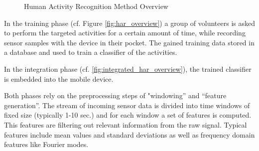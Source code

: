 \begin{figure}[htbp]
\centering
{} \hspace{1cm}
\caption{Human Activity Recognition Method Overview}
\label{fig:HAR_PHASES}
\end{figure}

In the training phase (cf. Figure \ref{fig:har_overview}) a group of
volunteers is asked to perform the targeted activities for a certain
amount of time, while recording sensor samples with the device in
their pocket.  The gained training data stored in a database and used
to train a classifier of the activities.

In the integration phase (cf. \ref{fig:integrated_har_overview}), the
trained classifier is embedded into the mobile device.

Both phases rely on the preprocessing steps of "windowing'' and
``feature generation''. The stream of incoming sensor data is divided into
time windows of fixed size (typically 1-10 sec.) and for each window
a set of features is computed. This features are filtering out
relevant information from the raw signal. Typical features include
mean values and standard deviations as well as frequency domain
features like Fourier modes.

